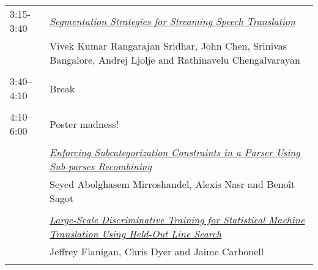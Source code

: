 \begin{tabular}{p{20mm}p{138mm}}
3:15-3:40 & \hyperlink{page.230}{\em Segmentation Strategies for Streaming Speech Translation}\\
         & Vivek Kumar Rangarajan Sridhar, John Chen, Srinivas Bangalore, Andrej Ljolje and Rathinavelu Chengalvarayan \\
\\

3:40--4:10 & Break
 \\
\\
4:10--6:00 & Poster madness!
 \\
\\
 & \hyperlink{page.239}{\em Enforcing Subcategorization Constraints in a Parser Using Sub-parses Recombining}\\
         & Seyed Abolghasem Mirroshandel, Alexis Nasr and Beno\^{i}t Sagot \\
\\

 & \hyperlink{page.248}{\em Large-Scale Discriminative Training for Statistical Machine Translation Using Held-Out Line Search}\\
         & Jeffrey Flanigan, Chris Dyer and Jaime Carbonell \\
\\

\end{tabular}
\newpage

